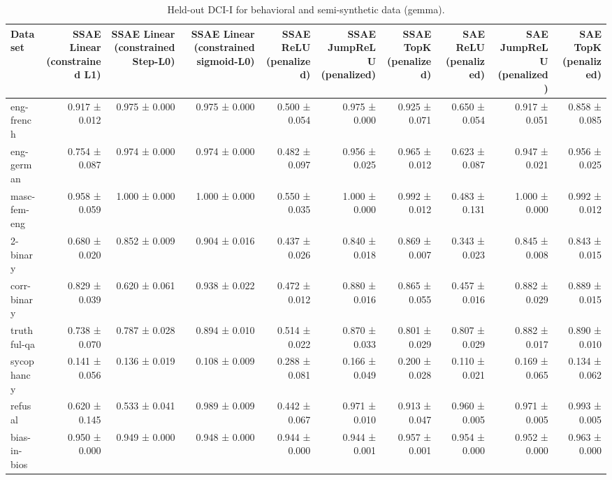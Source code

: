 \begin{table}[t]
\centering
\caption{Held-out DCI-I for behavioral and semi-synthetic data (gemma).}
\label{tab:all-datasets-gemma-dci-i}
\begin{tabular}{lrrrrrrrrr}
\toprule
Dataset & SSAE Linear (constrained L1) & SSAE Linear (constrained Step-L0) & SSAE Linear (constrained sigmoid-L0) & SSAE ReLU (penalized) & SSAE JumpReLU (penalized) & SSAE TopK (penalized) & SAE ReLU (penalized) & SAE JumpReLU (penalized) & SAE TopK (penalized) \\
\midrule
eng-french & 0.917 ± 0.012 & 0.975 ± 0.000 & 0.975 ± 0.000 & 0.500 ± 0.054 & 0.975 ± 0.000 & 0.925 ± 0.071 & 0.650 ± 0.054 & 0.917 ± 0.051 & 0.858 ± 0.085 \\
eng-german & 0.754 ± 0.087 & 0.974 ± 0.000 & 0.974 ± 0.000 & 0.482 ± 0.097 & 0.956 ± 0.025 & 0.965 ± 0.012 & 0.623 ± 0.087 & 0.947 ± 0.021 & 0.956 ± 0.025 \\
masc-fem-eng & 0.958 ± 0.059 & 1.000 ± 0.000 & 1.000 ± 0.000 & 0.550 ± 0.035 & 1.000 ± 0.000 & 0.992 ± 0.012 & 0.483 ± 0.131 & 1.000 ± 0.000 & 0.992 ± 0.012 \\
2-binary & 0.680 ± 0.020 & 0.852 ± 0.009 & 0.904 ± 0.016 & 0.437 ± 0.026 & 0.840 ± 0.018 & 0.869 ± 0.007 & 0.343 ± 0.023 & 0.845 ± 0.008 & 0.843 ± 0.015 \\
corr-binary & 0.829 ± 0.039 & 0.620 ± 0.061 & 0.938 ± 0.022 & 0.472 ± 0.012 & 0.880 ± 0.016 & 0.865 ± 0.055 & 0.457 ± 0.016 & 0.882 ± 0.029 & 0.889 ± 0.015 \\
truthful-qa & 0.738 ± 0.070 & 0.787 ± 0.028 & 0.894 ± 0.010 & 0.514 ± 0.022 & 0.870 ± 0.033 & 0.801 ± 0.029 & 0.807 ± 0.029 & 0.882 ± 0.017 & 0.890 ± 0.010 \\
sycophancy & 0.141 ± 0.056 & 0.136 ± 0.019 & 0.108 ± 0.009 & 0.288 ± 0.081 & 0.166 ± 0.049 & 0.200 ± 0.028 & 0.110 ± 0.021 & 0.169 ± 0.065 & 0.134 ± 0.062 \\
refusal & 0.620 ± 0.145 & 0.533 ± 0.041 & 0.989 ± 0.009 & 0.442 ± 0.067 & 0.971 ± 0.010 & 0.913 ± 0.047 & 0.960 ± 0.005 & 0.971 ± 0.005 & 0.993 ± 0.005 \\
bias-in-bios & 0.950 ± 0.000 & 0.949 ± 0.000 & 0.948 ± 0.000 & 0.944 ± 0.000 & 0.944 ± 0.001 & 0.957 ± 0.001 & 0.954 ± 0.000 & 0.952 ± 0.000 & 0.963 ± 0.000 \\
\bottomrule
\end{tabular}
\end{table}
